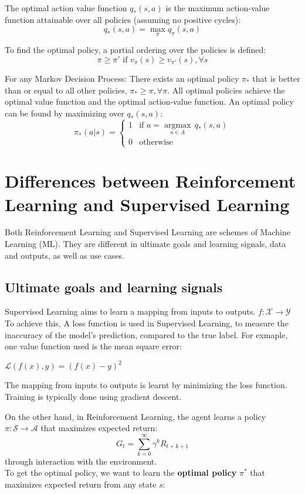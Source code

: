 \documentclass{article} %
\begin{document}
The optimal action value function \( q_*(s, a) \) is the maximum action-value function attainable over all policies (assuming no positive cycles):
\[
q_*(s, a) = \max_{\pi} q_\pi(s, a)
\]

To find the optimal policy, a partial ordering over the policies is defined:
\[
\pi \geq \pi' \text{ if } v_{\pi}(s) \geq v_{\pi'}(s), \forall s
\]

For any Markov Decision Process:
There exists an optimal policy $\pi_{*}$ that is better than or equal to all other policies, $\pi_{*} \geq \pi, \forall \pi$. All optimal policies achieve the optimal value function and the optimal action-value function.
An optimal policy can be found by maximizing over \( q_*(s, a) \):
\[
\pi_*(a|s) =
\begin{cases} 
1 & \text{if } a = \underset{a \in A}{\operatorname{argmax}} \, q_*(s, a) \\
0 & \text{otherwise}
\end{cases}
\]

\section{Differences between Reinforcement Learning and Supervised Learning}
\label{gen_inst}

Both Reinforcement Learning and Supervised Learning are schemes of Machine Learning (ML). They are different in ultimate goals and learning signals, data and outputs, as well as use cases.

\subsection{Ultimate goals and learning signals}
Supervised Learning aims to learn a mapping from inputs to outputs.
$f: \mathcal{X} \rightarrow \mathcal{Y}$
To achieve this, A loss function \cite{geeksforgeeks_lossfunctions} is used in Supervised Learning, to measure the inaccuracy of the model’s prediction, compared to the true label. For exmaple, one value function used is the mean square error:
\begin{center}
    $\mathcal{L}(f(x), y) = (f(x) - y)^2$
\end{center}
The mapping from inputs to outputs is learnt by minimizing the loss function. Training is typically done using gradient descent. 

On the other hand, in Reinforcement Learning, the agent learns a policy \(\pi : \mathcal{S} \to \mathcal{A}\) 
that maximizes expected return:
\[G_t = \sum_{k=0}^\infty \gamma^k R_{t+k+1}\]
through interaction with the environment. \\
To get the optimal policy, we want to learn the \textbf{optimal policy} \(\pi^*\) that maximizes expected return from any state \(s\):
\end{document}
